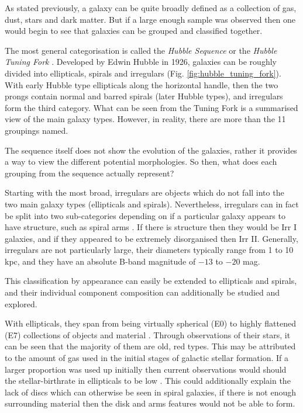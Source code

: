 \documentclass[12pt, twocolumn]{revtex4-1}    %
\begin{document}
As stated previously, a galaxy can be quite broadly defined as a collection of gas, dust, stars and dark matter. But if a large enough sample was observed then one would begin to see that galaxies can be grouped and classified together.

The most general categorisation is called the \textit{Hubble Sequence} or the \textit{Hubble Tuning Fork} \citep{carroll_astro}. Developed by Edwin Hubble in 1926, galaxies can be roughly divided into ellipticals, spirals and irregulars (Fig. \ref{fig:hubble_tuning_fork}). With early Hubble type ellipticals along the horizontal handle, then the two prongs contain normal and barred spirals (later Hubble types), and irregulars form the third category. What can be seen from the Tuning Fork is a summarised view of the main galaxy types. However, in reality, there are more than the 11 groupings named.

The sequence itself does not show the evolution of the galaxies, rather it provides a way to view the different potential morphologies. So then, what does each grouping from the sequence actually represent? 

Starting with the most broad, irregulars are objects which do not fall into the two main galaxy types (ellipticals and spirals). Nevertheless, irregulars can in fact be split into two sub-categories depending on if a particular galaxy appears to have structure, such as spiral arms \citep{carroll_astro}. If there is structure then they would be Irr I galaxies, and if they appeared to be extremely disorganised then Irr II. Generally, irregulars are not particularly large, their diameters typically range from 1 to 10 kpc, and they have an absolute B-band magnitude of $-13$ to $-20$ mag.


This classification by appearance can easily be extended to ellipticals and spirals, and their individual component composition can additionally be studied and explored. 

With ellipticals, they span from being virtually spherical (E0) to highly flattened (E7) collections of objects and material \citep{moore_databook}. Through observations of their stars, it can be seen that the majority of them are old, red types. This may be attributed to the amount of gas used in the initial stages of galactic stellar formation. If a larger proportion was used up initially then current observations would should the stellar-birthrate in ellipticals to be low \citep{carroll_astro}. This could additionally explain the lack of discs which can otherwise be seen in spiral galaxies, if there is not enough surrounding material then the disk and arms features would not be able to form.
\end{document}

